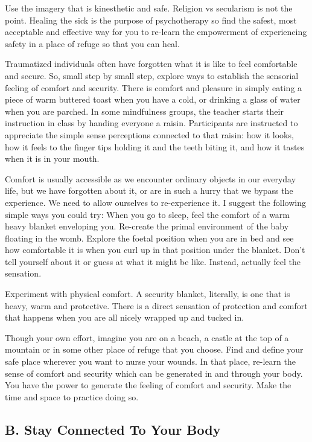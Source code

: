 \documentclass[]{book}
\begin{document}
Use the imagery that is kinesthetic and safe. Religion vs secularism is not the point. Healing the sick is the purpose of psychotherapy so find the safest, most acceptable and effective way for you to re-learn the empowerment of experiencing safety in a place of refuge so that you can heal.

Traumatized individuals often have forgotten what it is like to feel comfortable and secure. So, small step by small step, explore ways to establish the sensorial feeling of comfort and security. There is comfort and pleasure in simply eating a piece of warm buttered toast when you have a cold, or drinking a glass of water when you are parched. In some mindfulness groups, the teacher starts their instruction in class by handing everyone a raisin. Participants are instructed to appreciate the simple sense perceptions connected to that raisin: how it looks, how it feels to the finger tips holding it and the teeth biting it, and how it tastes when it is in your mouth.

Comfort is usually accessible as we encounter ordinary objects in our everyday life, but we have forgotten about it, or are in such a hurry that we bypass the experience. We need to allow ourselves to re-experience it. I suggest the following simple ways you could try: When you go to sleep, feel the comfort of a warm heavy blanket enveloping you. Re-create the primal environment of the baby floating in the womb. Explore the foetal position when you are in bed and see how comfortable it is when you curl up in that position under the blanket. Don't tell yourself about it or guess at what it might be like. Instead, actually feel the sensation.

Experiment with physical comfort. A security blanket, literally, is one that is heavy, warm and protective. There is a direct sensation of protection and comfort that happens when you are all nicely wrapped up and tucked in.

Though your own effort, imagine you are on a beach, a castle at the top of a mountain or in some other place of refuge that you choose. Find and define your safe place wherever you want to nurse your wounds. In that place, re-learn the sense of comfort and security which can be generated in and through your body. You have the power to generate the feeling of comfort and security. Make the time and space to practice doing so.

\hypertarget{b.-stay-connected-to-your-body}{%
\subsection*{B. Stay Connected To Your Body}\label{b.-stay-connected-to-your-body}}
\end{document}

